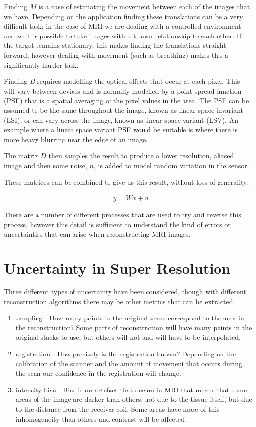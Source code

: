 Finding $M$ is a case of estimating the movement between each of the images that we have. Depending on the application finding these translations can be a very difficult task; in the case of MRI we are dealing with a controlled environment and so it is possible to take images with a known relationship to each other. If the target remains stationary, this makes finding the translations straight-forward, however dealing with movement (such as breathing) makes this a significantly harder task.

Finding $B$ requires modelling the optical effects that occur at each pixel. This will vary between devices and is normally modelled by a point spread function (PSF) that is a spatial averaging of the pixel values in the area. The PSF can be assumed to be the same throughout the image, known as linear space invariant (LSI), or can vary across the image, known as linear space variant (LSV). An example where a linear space variant PSF would be suitable is where there is more heavy blurring near the edge of an image.

The matrix $D$ then samples the result to produce a lower resolution, aliased image and then some noise, $n$, is added to model random variation in the sensor.

These matrices can be combined to give us this result, without loss of generality:

\begin{align}
& y = Wx + n \nonumber
\end{align}

There are a number of different processes that are used to try and reverse this process, however this detail is sufficient to understand the kind of errors or uncertainties that can arise when reconstructing MRI images.

\newpage
\section{Uncertainty in Super Resolution}\label{background:uncertainty}
Three different types of uncertainty have been considered, though with different reconstruction algorithms there may be other metrics that can be extracted.

\begin{enumerate}
	\item sampling - How many points in the original scans correspond to the area in the reconstruction? Some parts of reconstruction will have many points in the original stacks to use, but others will not and will have to be interpolated.
	\item registration - How precisely is the registration known? Depending on the calibration of the scanner and the amount of movement that occurs during the scan our confidence in the registration will change.
	\item intensity bias - Bias is an artefact that occurs in MRI that means that some areas of the image are darker than others, not due to the tissue itself, but due to the distance from the receiver coil. Some areas have more of this inhomogeneity than others and contrast will be affected.
\end{enumerate}


